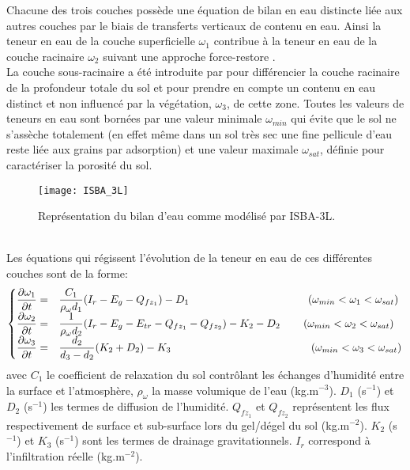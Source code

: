 \noindent Chacune des trois couches possède une équation de bilan en eau distincte liée aux autres couches par le biais de transferts verticaux de contenu en eau. Ainsi la teneur en eau de la couche superficielle $\omega_1$ contribue à la teneur en eau de la couche racinaire $\omega_2$ suivant une approche force-restore \citep{deardorff1978}.\\ 
\noindent La couche sous-racinaire a été introduite par \citet{boone1999} pour différencier la couche racinaire de la profondeur totale du sol et pour prendre en compte un contenu en eau distinct et non influencé par la végétation, $\omega_3$, de cette zone. Toutes les valeurs de teneurs en eau sont bornées par une valeur minimale $\omega_{min}$ qui évite que le sol ne s'assèche totalement (en effet même dans un sol très sec une fine pellicule d'eau reste liée aux grains par adsorption) et une valeur maximale $\omega_{sat}$, définie pour caractériser la porosité du sol.\\

\begin{figure}[h!]
\centering
\texttt{[image: ISBA\_3L]}
\caption{Représentation du bilan d'eau comme modélisé par ISBA-3L.}
\label{isba_3L}
\end{figure}
~\\

\noindent Les équations qui régissent l'évolution de la teneur en eau de ces différentes couches sont de la forme:
\begin{equation}
 \begin{cases}
 \dfrac{\partial \omega_{1}}{\partial t} =& \dfrac{C_{1}}{\rho_{\omega}d_{1}}(I_{r}-E_{g}-Q_{fz_{1}})-D_{1} \qquad 
 \hskip3.15cm
 \left(\omega_{min} <\omega_{1} <  \omega_{sat}\right)
 \\
 \dfrac{\partial \omega_{2}}{\partial t} =& \dfrac{1}{\rho_{\omega}d_{2}}(I_{r}-E_{g}-E_{tr}-Q_{fz_{1}}-Q_{fz_{2}})-K_{2}-D_{2} \qquad 
 \left(\omega_{min} <\omega_{2} <  \omega_{sat}\right)
 \\
 \dfrac{\partial \omega_{3}}{\partial t} =& \dfrac{d_{2}}{d_3-d_2}(K_{2}+D_{2})-K_{3} \qquad 
 \hskip3.85cm
 \left(\omega_{min} <\omega_{3} <  \omega_{sat}\right)
 \end{cases}
\end{equation}
avec $C_{1}$ le coefficient de relaxation du sol contrôlant les échanges d'humidité entre la surface et l'atmosphère, $\rho_{\omega}$ la masse volumique de l'eau (kg.m$^{-3}$). $D_{1}$ (s$^{-1}$) et $D_{2}$ (s$^{-1}$) les termes de diffusion de l'humidité. $Q_{fz_{1}}$ et $Q_{fz_{2}}$ représentent les flux respectivement de surface et sub-surface lors du gel/dégel du sol (kg.m$^{-2}$). $K_{2}$ (s$^{-1}$) et $K_{3}$ (s$^{-1}$) sont les termes de drainage gravitationnels. $I_{r}$ correspond à l'infiltration réelle (kg.m$^{-2}$).

